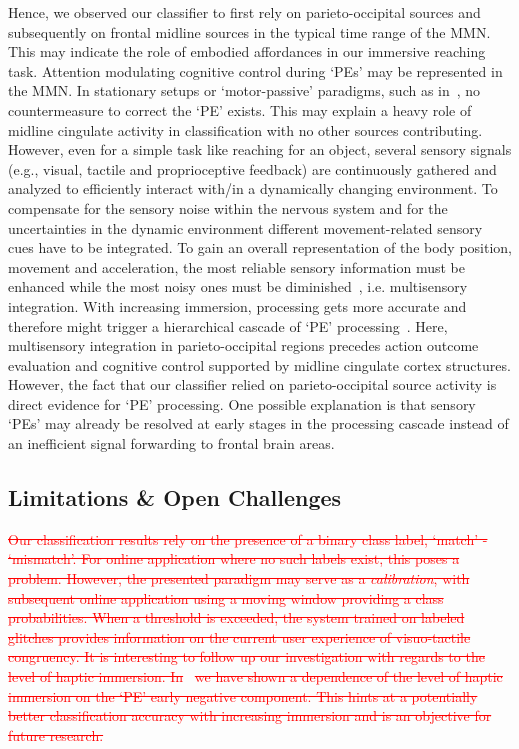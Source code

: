 Hence, we observed our classifier to first rely on parieto-occipital sources and subsequently on frontal midline sources in the typical time range of the MMN. This may indicate the role of embodied affordances in our immersive reaching task. Attention modulating cognitive control during `PEs' may be represented in the MMN. In stationary setups or `motor-passive' paradigms, such as in~\cite{Zander2016-ed}, no countermeasure to correct the `PE' exists. This may explain a heavy role of midline cingulate activity in classification with no other sources contributing. However, even for a simple task like reaching for an object, several sensory signals (e.g., visual, tactile and proprioceptive feedback) are continuously gathered and analyzed to efficiently interact with/in a dynamically changing environment. To compensate for the sensory noise within the nervous system and for the uncertainties in the dynamic environment different movement-related sensory cues have to be integrated. To gain an overall representation of the body position, movement and acceleration, the most reliable sensory information must be enhanced while the most noisy ones must be diminished~\cite{Fetsch2011-bp}, i.e. multisensory integration. With increasing immersion, processing gets more accurate and therefore might trigger a hierarchical cascade of `PE' processing~\cite{Singh2021-qc}. Here, multisensory integration in parieto-occipital regions precedes action outcome evaluation and cognitive control supported by midline cingulate cortex structures. However, the fact that our classifier relied on parieto-occipital source activity is direct evidence for `PE' processing. One possible explanation is that sensory `PEs' may already be resolved at early stages in the processing cascade instead of an inefficient signal forwarding to frontal brain areas.

\subsection{Limitations \textcolor{n}{\& Open Challenges}}

\textcolor{red}{\st{Our classification results rely on the presence of a binary class label, `match' - `mismatch'. For online application where no such labels exist, this poses a problem. However, the presented paradigm may serve as a \textit{calibration}, with subsequent online application using a moving window providing a class probabilities. When a threshold is exceeded, the system trained on labeled glitches provides information on the current user experience of visuo-tactile congruency. It is interesting to follow up our investigation with regards to the level of haptic immersion. In}~\cite{Gehrke2019-og}\st{ we have shown a dependence of the level of haptic immersion on the `PE' early negative component. This hints at a potentially better classification accuracy with increasing immersion and is an objective for future research.}}

